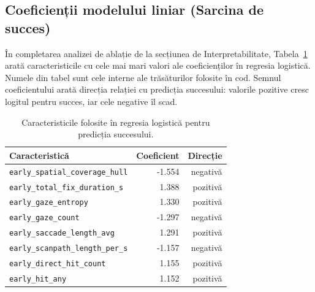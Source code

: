 \newpage

\subsection{Coeficienții modelului liniar (Sarcina de succes)}
În completarea analizei de ablație de la secțiunea de Interpretabilitate, Tabela~\ref{tab:appendix-weights} arată caracteristicile cu cele mai mari valori ale coeficienților în regresia logistică. Numele din tabel sunt cele interne ale trăsăturilor folosite în cod. Semnul coeficientului arată direcția relației cu predicția succesului: valorile pozitive cresc logitul pentru succes, iar cele negative îl scad.

\begin{table}[H]
	\centering
	\small
	\caption{Caracteristicile folosite în regresia logistică pentru predicția succesului.}
	\label{tab:appendix-weights}
	\begin{tabularx}{\columnwidth}{@{}>{\raggedright\arraybackslash}Xrr@{}}
		\toprule
		Caracteristică & Coeficient & Direcție \\
		\midrule
		\texttt{early\_spatial\_coverage\_hull} & -1.554 & negativă \\
		\texttt{early\_total\_fix\_duration\_s} & 1.388 & pozitivă \\
		\texttt{early\_gaze\_entropy} & 1.330 & pozitivă \\
		\texttt{early\_gaze\_count} & -1.297 & negativă \\
		\texttt{early\_saccade\_length\_avg} & 1.291 & pozitivă \\
		\texttt{early\_scanpath\_length\_per\_s} & -1.157 & negativă \\
		\texttt{early\_direct\_hit\_count} & 1.155 & pozitivă \\
		\texttt{early\_hit\_any} & 1.152 & pozitivă \\
		\bottomrule
	\end{tabularx}
\end{table}


